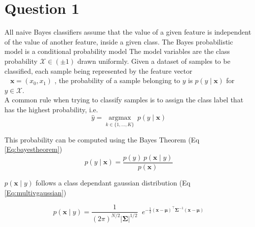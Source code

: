 \documentclass{article}
\begin{document}
\section{Question 1}
All naive Bayes classifiers assume that the value of a given feature is independent of the value of another feature, inside a given class.
The Bayes probabilistic model is a conditional probability model
The model variables are the class probability $\mathcal{X} \in (\pm 1)$ drawn uniformly.
Given a dataset of samples to be classified, each sample being represented by the feature vector \\
~
\begin{math}
\boldsymbol{x} = (x_0, x_1)
\end{math}
, the probability of a sample belonging to $y$ is 
\begin{math}
 p(y \mid \boldsymbol{x})
\end{math}
for $y \in \mathcal{X}$. \\
A common rule when trying to classify samples is to assign the class label that has the highest probability, i.e.
\begin{equation*}
    \hat {y}={\underset {k\in \{1,\dots ,K\}}{\operatorname {argmax} }}\ p(y \mid \boldsymbol{x})
\end{equation*}


\noindent This probability can be computed using the Bayes Theorem (Eq \ref{Eq:bayestheorem})
\begin{equation}
 p(y \mid \boldsymbol{x}) = \frac {p(y)\ p(\boldsymbol{x} \mid y)}{p(\boldsymbol{x}) }
\label{Eq:bayestheorem}
\end{equation}



\noindent $p(\boldsymbol{x} \mid y)$ follows a class dependant gaussian distribution (Eq \ref{Eq:multivgaussian})

\noindent 
\begin{equation}
    p(\boldsymbol{x} \mid y)={\frac {1}{(2\pi )^{N/2}\left|{\boldsymbol {\Sigma }}\right|^{1/2}}}\;\;e^{-{\frac {1}{2}}\left({\boldsymbol {x}}-{\boldsymbol {\mu }}\right)^{\top }{\boldsymbol {\Sigma }}^{-1}\left({\boldsymbol {x}}-{\boldsymbol {\mu }}\right)}
    \label{Eq:multivgaussian}
\end{equation}
\end{document}
